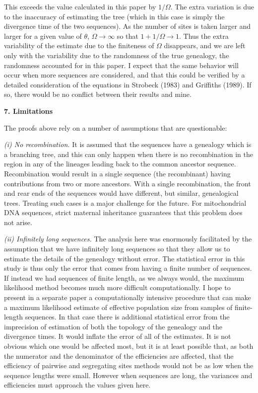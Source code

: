 This exceeds the value calculated in this paper by $1/\Omega$.  The extra
variation is due to the inaccuracy of estimating the tree (which in this
case is simply the divergence time of the two sequences).  As the number
of sites is taken larger and larger for a given value of $\theta$,
$\Omega \rightarrow \infty$ so that $1 + 1/\Omega \rightarrow 1$.
Thus the extra variability of the estimate due to the finiteness of
$\Omega$ disappears, and we are left only with the variability due to the
randomness of the true genealogy, the randomness accounted for in this paper.
I expect that the same behavior will occur when more sequences are
considered, and that this could be verified by a detailed consideration of
the equations in Strobeck (1983) and Griffiths (1989).  If so, there would
be no conflict between their results and mine.
\bigskip

{\bf 7. Limitations}
\medskip

The proofs above rely on a number of assumptions that are questionable:

{\it (i) No recombination.}  It is assumed that the sequences have a
genealogy which is a branching tree, and this can only happen when
there is no recombination in the region in any of the lineages leading
back to the common ancestor sequence.  Recombination would result in a
single sequence (the recombinant) having contributions from two or
more ancestors.  With a single recombination, the front and rear ends
of the sequences would have different, but similar, genealogical trees.
Treating such cases is a major challenge for the future.  For
mitochondrial DNA sequences, strict maternal inheritance guarantees that
this problem does not arise.

{\it (ii) Infinitely long sequences.}  The analysis here was enormously
facilitated by the assumption that we have infinitely long sequences
so that they allow us to estimate the details of the genealogy without
error.  The
statistical error in this study is thus only the error that comes from
having a finite number of sequences.  If instead we had sequences of
finite length, as we always would, the maximum likelihood method becomes
much more difficult computationally.  I hope to present in a separate
paper a computationally intensive procedure that can make a maximum
likelihood estimate of effective population size from samples of
finite-length sequences.  In that case there is additional statistical
error from the imprecision of estimation of both the topology of the
genealogy and the divergence times.  It would
inflate the error of all of the estimates.
It is not obvious which one would be affected most, but it is at least
possible that, as both the numerator and the denominator of the
efficiencies are affected, that the efficiency of pairwise and segregating
sites methods would not be as low when the sequence lengths were small.
However when
sequences are long, the variances and efficiencies must approach the values
given here.

